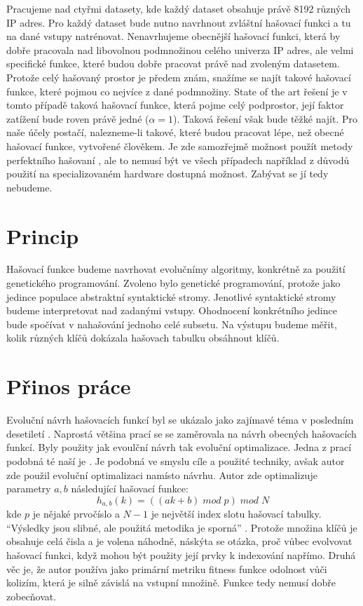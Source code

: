 Pracujeme nad ctyřmi datasety, kde každý dataset obsahuje právě 8192 různých 
IP adres. Pro každý dataset bude nutno navrhnout zvláštní hašovací funkci a tu
na dané vstupy natrénovat. Nenavrhujeme obecnější hašovací funkci, která by dobře
pracovala nad libovolnou podmnožinou celého univerza IP adres, ale velmi
specifické funkce, které budou dobře pracovat právě nad zvoleným datasetem.
Protože celý hašovaný prostor je předem znám, snažíme se najít takové hašovací
funkce, které pojmou co nejvíce z dané podmnožiny. State of the art řešení je v
tomto případě taková hašovací funkce, která pojme celý podprostor, její 
faktor zatížení bude roven právě jedné ($\alpha = 1$). Taková řešení však
bude těžké najít. Pro naše účely postačí, nalezneme-li takové, které budou
pracovat lépe, než obecné hašovací funkce, vytvořené člověkem. Je zde samozřejmě
možnost použít metody perfektního hašovaní \cite{perfect_hashing}, ale to nemusí
být ve všech případech například z důvodů použití na specializovaném hardware
dostupná možnost. Zabývat se jí tedy nebudeme.


\section{Princip}
Hašovací funkce budeme navrhovat evolučnímy algoritmy, konkrétně za použití 
genetického programování. Zvoleno bylo genetické programování, protože 
jako jedince populace abstraktní syntaktické stromy. Jenotlivé syntaktické 
stromy budeme interpretovat nad zadanými vstupy. Ohodnocení konkrétního jedince
bude spočívat v nahašování jednoho celé subsetu. Na výstupu budeme měřit, kolik 
různých klíčů dokázala hašovach tabulku obsáhnout klíčů.

\section{Přinos práce}
Evoluční návrh hašovacích funkcí byl se ukázalo jako zajímavé téma v posledním 
desetiletí \cite{dobai0,NCHF_auto_design,grammar_evolution,safdari}.
Naprostá většina prací se se zaměrovala na návrh obecných hašovacích
funkcí. Byly použity jak evoulční návrh tak evoluční optimalizace. Jedna z prací
podobná té naší je \cite{safdari}. Je podobná ve smyslu cíle a použité techniky,
avšak autor zde použil evoluční optimalizaci namísto návrhu. Autor zde optimalizuje
parametry $a,b$ následující hašovací funkce:
$$h_{a,b}(k) = ((ak + b) \; mod \; p) \; mod \; N$$
kde $p$ je nějaké prvočíslo a $N - 1$ je největší index slotu hašovací tabulky.
``Výsledky jsou slibné, ale použitá metodika je sporná'' \cite{NCHF_auto_design}.
Protože množina klíčů je obsahuje celá čisla a je volena náhodně, náskýta se otázka,
proč vůbec evolvovat hašovací funkci, když mohou být použity její prvky k indexování
napřímo. Druhá věc je, že autor používa jako primární metriku fitness funkce odolnost
vůči kolizím, která je silně závislá na vstupní množině. Funkce tedy nemusí dobře 
zobecňovat.

